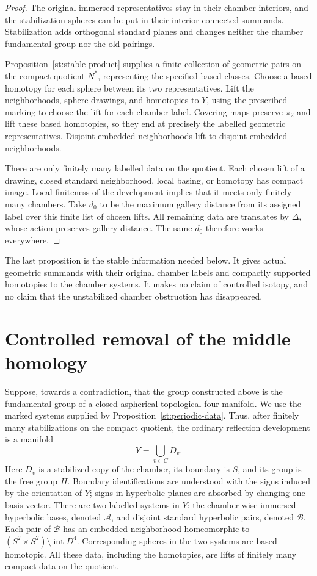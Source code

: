 \documentclass[11pt]{article}
\theoremstyle{definition}
\theoremstyle{remark}
\begin{document}
\begin{proof}
The original immersed representatives stay in their chamber interiors,
and the stabilization spheres can be put in their interior connected
summands.  Stabilization adds orthogonal standard planes and changes
neither the chamber fundamental group nor the old pairings.

Proposition~\ref{st:stable-product} supplies a finite collection of
geometric pairs on the compact quotient $N^*$, representing the
specified based classes.  Choose a based homotopy for each sphere
between its two representatives.  Lift the neighborhoods, sphere
drawings, and homotopies to $Y$, using the prescribed marking to choose
the lift for each chamber label.  Covering maps preserve $\pi_2$ and
lift these based homotopies, so they end at precisely the labelled
geometric representatives.  Disjoint embedded neighborhoods lift to
disjoint embedded neighborhoods.

There are only finitely many labelled data on the quotient.  Each chosen
lift of a drawing, closed standard neighborhood, local basing, or
homotopy has compact image.  Local finiteness of the development implies
that it meets only finitely many chambers.  Take $d_0$ to be the maximum
gallery distance from its assigned label over this finite list of
chosen lifts.  All remaining data are translates by $\Delta$, whose
action preserves gallery distance.  The same $d_0$ therefore works
everywhere.
\end{proof}

The last proposition is the stable information needed below.  It gives
actual geometric summands with their original chamber labels and
compactly supported homotopies to the chamber systems.  It makes no
claim of controlled isotopy, and no claim that the unstabilized chamber
obstruction has disappeared.

\section{Controlled removal of the middle homology}\label{ct:section}

Suppose, towards a contradiction, that the group constructed above is the
fundamental group of a closed aspherical topological four-manifold.  We use
the marked systems supplied by Proposition~\ref{st:periodic-data}.  Thus,
after finitely many stabilizations on the compact quotient, the ordinary
reflection development is a manifold
\[
                 Y=\bigcup_{v\in C}D_v.
\]
Here $D_v$ is a stabilized copy of the chamber, its boundary is $S$, and
its group is the free group $H$.  Boundary identifications are understood
with the signs induced by the orientation of $Y$; signs in hyperbolic
planes are absorbed by changing one basis vector.  There are two
labelled systems in $Y$:
the chamber-wise immersed hyperbolic bases, denoted $\mathcal A$, and
disjoint standard hyperbolic pairs, denoted $\mathcal B$.  Each pair of
$\mathcal B$ has an embedded neighborhood homeomorphic to
$(S^2\times S^2)\setminus\operatorname{int}D^4$.  Corresponding spheres in
the two systems are based-homotopic.  All these data, including the
homotopies, are lifts of finitely many compact data on the quotient.
\end{document}
